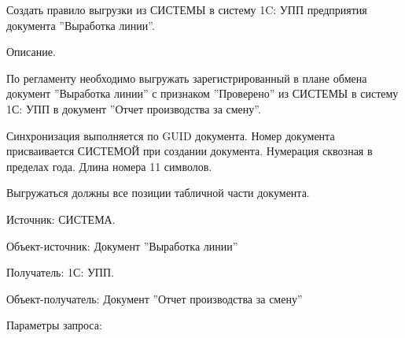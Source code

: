 
Создать правило выгрузки из СИСТЕМЫ в систему  1C: УПП предприятия документа ''Выработка линии''.


Описание.

По регламенту необходимо выгружать зарегистрированный в плане обмена документ ''Выработка линии'' с признаком ''Проверено'' из СИСТЕМЫ в систему 1С: УПП в документ ''Отчет производства за смену''.

Синхронизация выполняется по GUID документа.
Номер документа присваивается СИСТЕМОЙ при создании документа. Нумерация сквозная в пределах года. Длина номера 11 символов.

Выгружаться должны все позиции табличной части документа.


Источник: СИСТЕМА.

Объект-источник: Документ ''Выработка линии''

Получатель: 1С: УПП.

Объект-получатель: Документ ''Отчет производства за смену''

Параметры запроса:

